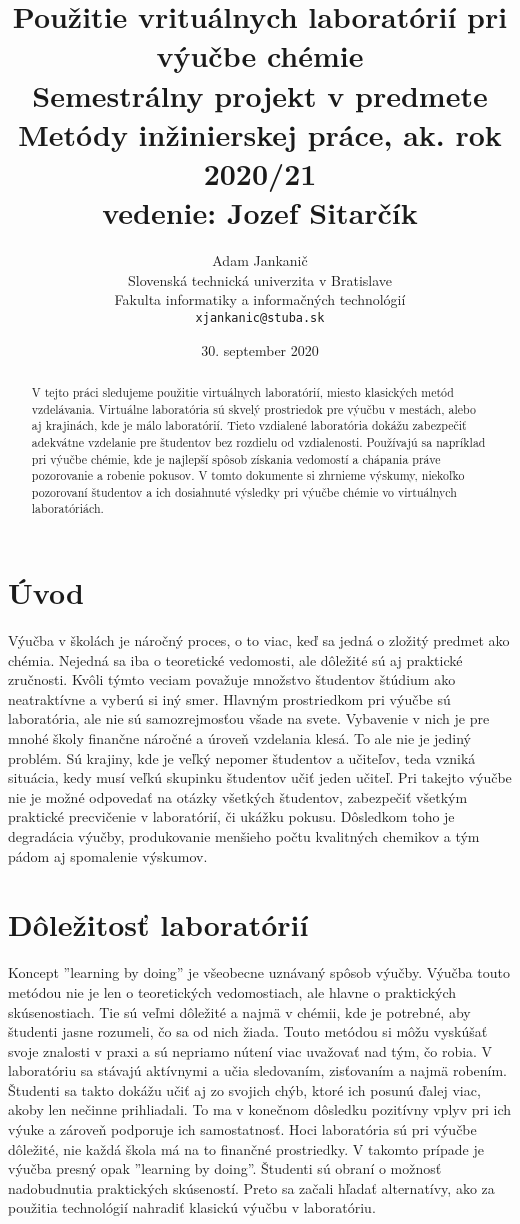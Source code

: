 \documentclass[10pt,twoside,slovak,a4paper]{article}
\title{Použitie vrituálnych laboratórií pri výučbe chémie \\
 
 {\normalsize Semestrálny projekt v predmete Metódy inžinierskej práce, ak. rok 2020/21\\
 \normalsize vedenie: Jozef  Sitarčík}} %
\author{Adam Jankanič\\[2pt]
	{\small Slovenská technická univerzita v Bratislave}\\
	{\small Fakulta informatiky a informačných technológií}\\
	{\small \texttt{xjankanic@stuba.sk}}
	}
\date{\small 30. september 2020} %
\begin{document}
\maketitle

\begin{abstract}
V tejto práci sledujeme použitie virtuálnych laboratórií, miesto klasických metód vzdelávania. 
Virtuálne laboratória sú skvelý prostriedok pre výučbu v mestách, alebo aj krajinách, kde je málo laboratórií. 
Tieto vzdialené laboratória dokážu zabezpečiť adekvátne vzdelanie pre študentov bez rozdielu od vzdialenosti. 
Používajú sa napríklad pri výučbe chémie, kde je najlepší spôsob získania vedomostí a chápania práve pozorovanie a robenie pokusov. 
V tomto dokumente si zhrnieme výskumy, niekoľko pozorovaní študentov a ich dosiahnuté výsledky pri výučbe chémie vo virtuálnych laboratóriách.
\end{abstract}



\section{Úvod}

Výučba v školách je náročný proces, o to viac, keď sa jedná o zložitý predmet ako chémia. Nejedná sa iba o teoretické vedomosti, ale dôležité sú aj praktické zručnosti. Kvôli týmto veciam považuje množstvo študentov štúdium ako neatraktívne a vyberú si iný smer. Hlavným prostriedkom pri výučbe sú laboratória, ale nie sú samozrejmosťou všade na svete. Vybavenie v nich je pre mnohé školy finančne náročné a úroveň vzdelania klesá. To ale nie je jediný problém. Sú krajiny, kde je veľký nepomer študentov a učiteľov, teda vzniká situácia, kedy musí veľkú skupinku študentov učiť jeden učiteľ. Pri takejto výučbe nie je možné odpovedať na otázky všetkých študentov, zabezpečiť všetkým praktické precvičenie v laboratórií, či  ukážku pokusu. Dôsledkom toho je degradácia výučby, produkovanie menšieho počtu kvalitných chemikov a tým pádom aj spomalenie výskumov.


\section{Dôležitosť laboratórií} \label{d_laboratorii}
Koncept ''learning by doing'' je všeobecne uznávaný spôsob výučby. Výučba touto metódou nie je len o teoretických vedomostiach, ale hlavne o praktických skúsenostiach. Tie sú veľmi dôležité a najmä v chémii, kde je potrebné, aby študenti jasne rozumeli, čo sa od nich žiada. Touto metódou si môžu vyskúšať svoje znalosti v praxi a sú nepriamo nútení viac uvažovať nad tým, čo robia. V laboratóriu sa stávajú aktívnymi a učia sledovaním, zisťovaním a najmä robením. Študenti sa takto dokážu učiť aj zo svojich chýb, ktoré ich posunú ďalej viac, akoby len nečinne prihliadali. To ma v konečnom dôsledku pozitívny vplyv pri ich výuke a zároveň podporuje ich samostatnosť. Hoci laboratória sú pri výučbe dôležité, nie každá škola má na to finančné prostriedky. V takomto prípade je výučba presný opak ''learning by doing''. Študenti sú obraní o možnosť nadobudnutia praktických skúseností. Preto sa začali hľadať alternatívy, ako za použitia technológií nahradiť klasickú výučbu v laboratóriu.
\end{document}
